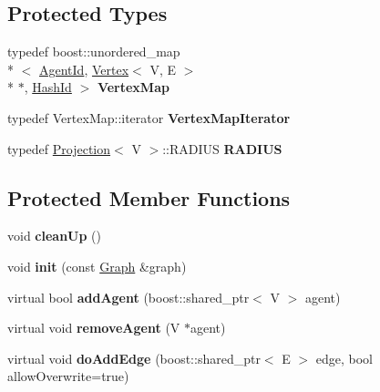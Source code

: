 \subsection*{Protected Types}
\begin{DoxyCompactItemize}
\item 
\hypertarget{classrepast_1_1_graph_a8d44d7ffee81310e667905eb64798228}{typedef boost\-::unordered\-\_\-map\\*
$<$ \hyperlink{classrepast_1_1_agent_id}{Agent\-Id}, \hyperlink{classrepast_1_1_vertex}{Vertex}$<$ V, E $>$\\*
 $\ast$, \hyperlink{structrepast_1_1_hash_id}{Hash\-Id} $>$ {\bfseries Vertex\-Map}}\label{classrepast_1_1_graph_a8d44d7ffee81310e667905eb64798228}

\item 
\hypertarget{classrepast_1_1_graph_aeb3e3741243a80c9d3732805b018ed00}{typedef Vertex\-Map\-::iterator {\bfseries Vertex\-Map\-Iterator}}\label{classrepast_1_1_graph_aeb3e3741243a80c9d3732805b018ed00}

\item 
\hypertarget{classrepast_1_1_graph_a1c3c8e5132aa39f51bf64440e34f3e5c}{typedef \hyperlink{classrepast_1_1_projection}{Projection}$<$ V $>$\-::R\-A\-D\-I\-U\-S {\bfseries R\-A\-D\-I\-U\-S}}\label{classrepast_1_1_graph_a1c3c8e5132aa39f51bf64440e34f3e5c}

\end{DoxyCompactItemize}
\subsection*{Protected Member Functions}
\begin{DoxyCompactItemize}
\item 
\hypertarget{classrepast_1_1_graph_ac355b765b3ebcaafb62603ded91fb170}{void {\bfseries clean\-Up} ()}\label{classrepast_1_1_graph_ac355b765b3ebcaafb62603ded91fb170}

\item 
\hypertarget{classrepast_1_1_graph_abb88d9a266f2dde1782f62f221479314}{void {\bfseries init} (const \hyperlink{classrepast_1_1_graph}{Graph} \&graph)}\label{classrepast_1_1_graph_abb88d9a266f2dde1782f62f221479314}

\item 
\hypertarget{classrepast_1_1_graph_aab6a71c186e6acbe4e04dcd1a866712d}{virtual bool {\bfseries add\-Agent} (boost\-::shared\-\_\-ptr$<$ V $>$ agent)}\label{classrepast_1_1_graph_aab6a71c186e6acbe4e04dcd1a866712d}

\item 
\hypertarget{classrepast_1_1_graph_a437e50a2ca1330b1bd3d582cf711b628}{virtual void {\bfseries remove\-Agent} (V $\ast$agent)}\label{classrepast_1_1_graph_a437e50a2ca1330b1bd3d582cf711b628}

\item 
\hypertarget{classrepast_1_1_graph_a83187d1adf22e412f871102f5883df22}{virtual void {\bfseries do\-Add\-Edge} (boost\-::shared\-\_\-ptr$<$ E $>$ edge, bool allow\-Overwrite=true)}\label{classrepast_1_1_graph_a83187d1adf22e412f871102f5883df22}

\end{DoxyCompactItemize}
